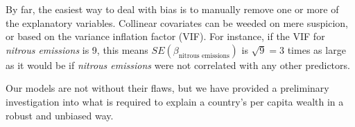 \documentclass[11pt]{article}
\begin{document}
By far, the easiest way to deal with bias is to manually remove one or more of the explanatory variables. Collinear covariates can be weeded on mere suspicion, or based on the variance inflation factor (VIF). For instance, if the VIF for \emph{nitrous emissions} is 9, this means $SE(\beta_{\textrm{nitrous emissions}})$ is $\sqrt{9} = 3$ times as large as it would be if \emph{nitrous emissions} were not correlated with any other predictors.

Our models are not without their flaws, but we have provided a preliminary investigation into what is required to explain a country's per capita wealth in a robust and unbiased way.



\theendnotes
\end{document}
